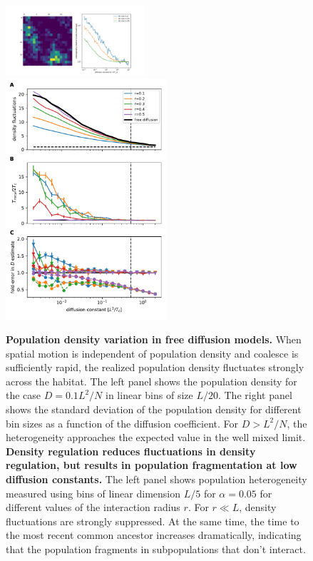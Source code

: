 \documentclass[aps,rmp, twocolumn]{revtex4}
\begin{document}
\begin{figure}
    \includegraphics[width=0.46\textwidth]{figures/heterogeneity_free_diffusion}
    \includegraphics[width=0.53\textwidth]{figures/stable_density}
    \caption{\label{fig:density_reg}  {\bf Population density variation in free diffusion models.}
    When spatial motion is independent of population density and coalesce is sufficiently rapid, the realized population density fluctuates strongly across the habitat. The left panel shows the population density for the case $D = 0.1 L^2/N$ in linear bins of size $L/20$. The right panel shows the standard deviation of the population density for different bin sizes as a function of the diffusion coefficient. For $D>L^2/N$, the heterogeneity approaches the expected value in the well mixed limit.
    {\bf Density regulation reduces fluctuations in density regulation, but results in population fragmentation at low diffusion constants.} The left panel shows population heterogeneity measured using bins of linear dimension $L/5$ for $\alpha =0.05$ for different values of the interaction radius $r$. For $r\ll L$, density fluctuations are strongly suppressed. At the same time, the time to the most recent common ancestor increases dramatically, indicating that the population fragments in subpopulations that don't interact.}
\end{figure}
\end{document}
